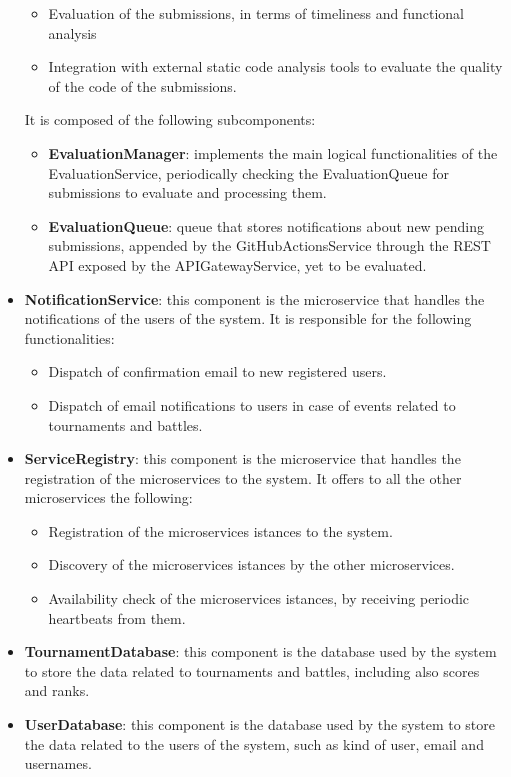 \begin{itemize}
    \begin{itemize}
        \item Evaluation of the submissions, in terms of timeliness and functional analysis 
        \item Integration with external static code analysis tools to evaluate the quality of the code of the submissions.
    \end{itemize}
    It is composed of the following subcomponents:
    \begin{itemize}
        \item \textbf{EvaluationManager}: implements the main logical functionalities of the EvaluationService, periodically checking the EvaluationQueue for submissions to evaluate and processing them.
        \item \textbf{EvaluationQueue}: queue that stores notifications about new pending submissions, appended by the GitHubActionsService through the REST API exposed by the APIGatewayService, yet to be evaluated.
    \end{itemize}
    \item \textbf{NotificationService}: this component is the microservice that handles the notifications of the users of the system. It is responsible for the following functionalities:
    \begin{itemize}
        \item Dispatch of confirmation email to new registered users.
        \item Dispatch of email notifications to users in case of events related to tournaments and battles.
    \end{itemize}
    \item \textbf{ServiceRegistry}: this component is the microservice that handles the registration of the microservices to the system. It offers to all the other microservices the following:
    \begin{itemize}
        \item Registration of the microservices istances to the system.
        \item Discovery of the microservices istances by the other microservices.
        \item Availability check of the microservices istances, by receiving periodic heartbeats from them.
    \end{itemize}
    \item \textbf{TournamentDatabase}: this component is the database used by the system to store the data related to tournaments and battles, including also scores and ranks.
    \item \textbf{UserDatabase}: this component is the database used by the system to store the data related to the users of the system, such as kind of user, email and usernames.
\end{itemize}
